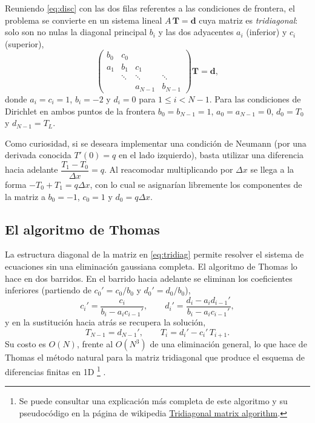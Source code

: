 \documentclass[12pt,twocolumn]{article}
\begin{document}
Reuniendo \eqref{eq:disc} con las dos filas referentes a las condiciones de frontera, el problema se
convierte en un sistema lineal $A\,\mathbf{T}=\mathbf{d}$ cuya matriz es
\emph{tridiagonal}: solo son no nulas la diagonal principal $b_i$ y las dos
adyacentes $a_i$ (inferior) y $c_i$ (superior),
\begin{equation}
\begin{pmatrix}
b_0 & c_0 & & \\
a_1 & b_1 & c_1 & \\
& \ddots & \ddots & \ddots \\
& & a_{N-1} & b_{N-1}
\end{pmatrix}
\mathbf{T}=\mathbf{d},
\label{eq:tridiag}
\end{equation}
donde $a_i=c_i=1$, $b_i=-2$ y $d_i=0$ para $1\leq i < N-1$.
Para las condiciones de Dirichlet en ambos puntos de la frontera $b_0=b_{N-1}=1$, $a_0=a_{N-1}=0$, $d_0=T_0$ y $d_{N-1}=T_L$.

Como curiosidad, si se deseara implementar una condición de Neumann (por una derivada conocida $T'(0) = q$ en el lado izquierdo), basta utilizar una diferencia hacia adelante $\dfrac{T_1 - T_0}{\Delta x} = q$. Al reacomodar multiplicando por $\Delta x$ se llega a la forma $-T_0 + T_1 = q \Delta x$, con lo cual se asignarían libremente los componentes de la matriz a $b_0=-1$, $c_0=1$ y $d_0=q\Delta x$.

\subsection{El algoritmo de Thomas}
La estructura diagonal de la matriz en \eqref{eq:tridiag}  permite resolver el sistema de ecuaciones sin una eliminación
gaussiana completa. El algoritmo de Thomas lo hace en dos barridos. En el
barrido hacia adelante se eliminan los coeficientes inferiores (partiendo de
$c_0'=c_0/b_0$ y $d_0'=d_0/b_0$),
$$
c_i'=\frac{c_i}{b_i-a_i c_{i-1}'},\qquad
d_i'=\frac{d_i-a_i d_{i-1}'}{b_i-a_i c_{i-1}'},
$$
y en la sustitución hacia atrás se recupera la solución,
$$
T_{N-1}=d_{N-1}',\qquad T_i=d_i'-c_i'\,T_{i+1}.
$$
Su costo es $O(N)$, frente al $O(N^3)$ de una eliminación general, lo que hace
de Thomas el método natural para la matriz tridiagonal que produce el esquema
de diferencias finitas en 1D%
\footnote{%
Se puede consultar una explicación más completa de este algoritmo y su pseudocódigo en la página de wikipedia
\href{https://en.wikipedia.org/wiki/Tridiagonal_matrix_algorithm}{Tridiagonal matrix algorithm}.
}
.
\end{document}
